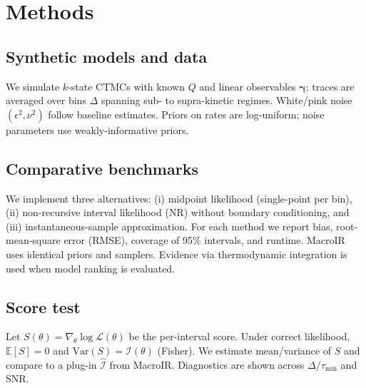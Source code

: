 \documentclass[9pt]{elife}
\begin{document}
\section*{Methods}
\subsection*{Synthetic models and data}
We simulate $k$-state CTMCs with known $Q$ and linear observables $\bm{\gamma}$; traces are averaged over bins $\Delta$ spanning sub- to supra-kinetic regimes. White/pink noise $(\epsilon^2,\nu^2)$ follow baseline estimates. Priors on rates are log-uniform; noise parameters use weakly-informative priors.

\subsection*{Comparative benchmarks}
We implement three alternatives: (i) midpoint likelihood (single-point per bin), (ii) non-recursive interval likelihood (NR) without boundary conditioning, and (iii) instantaneous-sample approximation. For each method we report bias, root-mean-square error (RMSE), coverage of 95\% intervals, and runtime. MacroIR uses identical priors and samplers. Evidence via thermodynamic integration is used when model ranking is evaluated.

\subsection*{Score test}
Let $S(\theta)=\nabla_\theta \log \mathcal{L}(\theta)$ be the per-interval score. Under correct likelihood, $\mathbb{E}[S]=0$ and $\mathrm{Var}(S)=\mathcal{I}(\theta)$ (Fisher). We estimate mean/variance of $S$ and compare to a plug-in $\widehat{\mathcal{I}}$ from MacroIR. Diagnostics are shown across $\Delta/\tau_{\min}$ and SNR.

\end{document}

